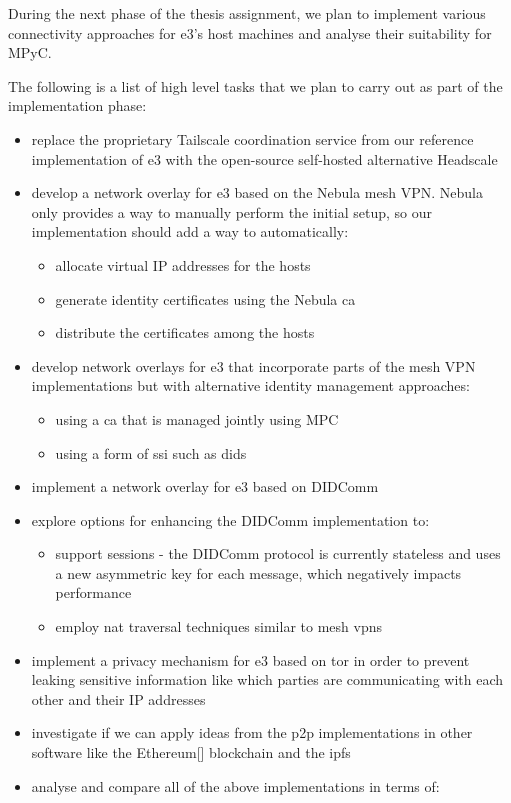 During the next phase of the thesis assignment, we plan to implement
various connectivity approaches for \gls{e3}'s host machines and analyse
their suitability for MPyC.

The following is a list of high level tasks that we plan to carry out as
part of the implementation phase:

\begin{itemize}
\tightlist
\item
  replace the proprietary Tailscale coordination service from our
  reference implementation of \gls{e3} with the open-source self-hosted
  alternative Headscale\autocite{fontJuanfontHeadscale2022}
\item
  develop a network overlay for \gls{e3} based on the Nebula mesh VPN.
  Nebula only provides a way to manually perform the initial setup, so
  our implementation should add a way to automatically:

  \begin{itemize}
  \tightlist
  \item
    allocate virtual IP addresses for the hosts
  \item
    generate identity certificates using the Nebula \gls{ca}
  \item
    distribute the certificates among the hosts
  \end{itemize}
\item
  develop network overlays for \gls{e3} that incorporate parts of the
  mesh VPN implementations but with alternative identity management
  approaches:

  \begin{itemize}
  \tightlist
  \item
    using a \gls{ca} that is managed jointly using MPC
  \item
    using a form of \gls{ssi} such as \glspl{did}
  \end{itemize}
\item
  implement a network overlay for \gls{e3} based on DIDComm
\item
  explore options for enhancing the DIDComm implementation to:

  \begin{itemize}
  \tightlist
  \item
    support sessions - the DIDComm protocol is currently stateless and
    uses a new asymmetric key for each message, which negatively impacts
    performance
  \item
    employ \gls{nat} traversal techniques similar to mesh \glspl{vpn}
  \end{itemize}
\item
  implement a privacy mechanism for \gls{e3} based on \gls{tor} in order
  to prevent leaking sensitive information like which parties are
  communicating with each other and their IP addresses
\item
  investigate if we can apply ideas from the \gls{p2p} implementations
  in other software like the
  Ethereum{[}\textcite{ethereumDocs}{]}\autocite{ethereumYellowPaper}
  blockchain and the \gls{ipfs} \autocite{ipfsDocs}
\item
  analyse and compare all of the above implementations in terms of:


\end{itemize}

